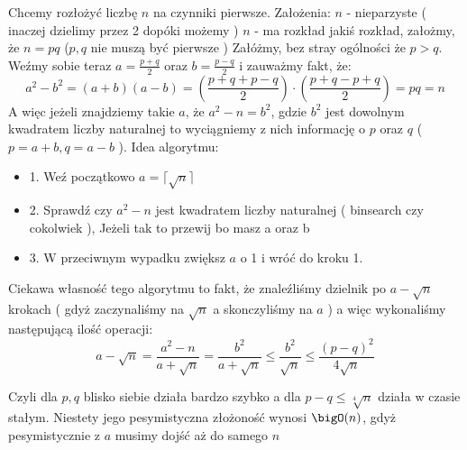 Chcemy rozłożyć liczbę $n$ na czynniki pierwsze. \newline
Założenia: \newline
$n$ - nieparzyste ( inaczej dzielimy przez 2 dopóki możemy )
\newline
$n$ - ma rozkład jakiś rozkład, założmy, że $n = pq$ ($p,q$ nie muszą być pierwsze )
\newline \newline
Załóżmy, bez stray ogólności że $p > q$.
Weźmy sobie teraz $a = \frac{p+q}{2}$ oraz $b = \frac{p-q}{2}$ i zauważmy fakt, że:
$$a^2 - b^2 = (a+b)(a-b) = (\frac{p+q+p-q}{2}) \cdot (\frac{p+q-p+q}{2}) = pq = n$$
A więc jeżeli znajdziemy takie $a$, że $a^2 - n = b^2$, gdzie $b^2$ jest dowolnym kwadratem liczby naturalnej to wyciągniemy z nich informację o $p$ oraz $q$ ( $p = a+b, q = a-b$ ).
\newline \newline
Idea algorytmu:
\begin{itemize}
    \item 1. Weź początkowo $a = \lceil \sqrt{n} \rceil$
    
    \item 2. Sprawdź czy $a^2 - n$ jest kwadratem liczby naturalnej ( binsearch czy cokolwiek ), Jeżeli tak to przewij bo masz a oraz b
    
    \item 3. W przeciwnym wypadku zwiększ $a$ o 1 i wróć do kroku 1.
\end{itemize}
Ciekawa własność tego algorytmu to fakt, że znaleźliśmy dzielnik po $a - \sqrt{n}$ krokach ( gdyż zaczynaliśmy na $\sqrt{n}$ a skonczyliśmy na $a$ ) a więc wykonaliśmy następującą ilość operacji:
$$a - \sqrt{n} = \frac{a^2 - n}{a + \sqrt{n}} = \frac{b^2}{a + \sqrt{n}} \leq \frac{b^2}{\sqrt{n}} \leq  \frac{(p-q)^2}{4\sqrt{n}}$$

Czyli dla $p,q$ blisko siebie działa bardzo szybko a dla $p-q \leq \sqrt[4]{n}$ działa w czasie stałym. Niestety jego pesymistyczna złożoność wynosi $\bigO(n)$, gdyż pesymistycznie z $a$ musimy dojść aż do samego $n$